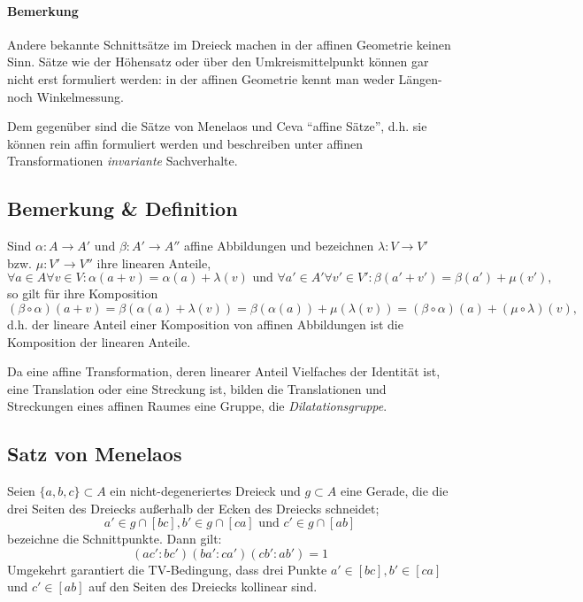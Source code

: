 \paragraph{Bemerkung}
	Andere bekannte Schnittsätze im Dreieck machen in der affinen Geometrie keinen Sinn. Sätze wie der Höhensatz oder über den Umkreismittelpunkt können gar nicht erst formuliert werden: in der affinen Geometrie kennt man weder Längen- noch Winkelmessung.
	
	Dem gegenüber sind die Sätze von Menelaos und Ceva "`affine Sätze"', d.h. sie können rein affin formuliert werden und beschreiben unter affinen Transformationen \emph{invariante} Sachverhalte.
\subsection{Bemerkung \& Definition}
	Sind $ \alpha:A\to A' $ und $ \beta:A'\to A'' $ affine Abbildungen und bezeichnen $ \lambda:V\to V' $ bzw. $ \mu:V'\to V'' $ ihre linearen Anteile,
		\[ \forall a\in A\forall v\in V:\alpha(a+v) = \alpha(a)+\lambda(v)\text{ und }\forall a'\in A'\forall v'\in V':\beta(a'+v') = \beta(a')+\mu(v'), \]
	so gilt für ihre Komposition
		\[ (\beta\circ\alpha)(a+v) = \beta(\alpha(a)+\lambda(v)) = \beta(\alpha(a))+\mu(\lambda(v)) = (\beta\circ\alpha)(a)+(\mu\circ\lambda)(v), \]
	d.h. der lineare Anteil einer Komposition von affinen Abbildungen ist die Komposition der linearen Anteile.
	
	\begin{Definition}[Dilatationsgruppe]
	Da eine affine Transformation, deren linearer Anteil Vielfaches der Identität ist, eine Translation oder eine Streckung ist, bilden die Translationen und Streckungen eines affinen Raumes eine Gruppe, die \emph{Dilatationsgruppe}.
	\end{Definition}
	
\subsection{Satz von Menelaos}
	\begin{Satz}
		Seien $ \{a,b,c\}\subset A $ ein nicht-degeneriertes Dreieck und $ g\subset A $ eine Gerade, die die drei Seiten des Dreiecks außerhalb der Ecken des Dreiecks schneidet;
			\[ a'\in g\cap [bc],b'\in g\cap [ca] \text{ und }c'\in g\cap [ab] \]
		bezeichne die Schnittpunkte. Dann gilt:
			\[ (ac':bc')(ba':ca')(cb':ab') = 1 \]
		Umgekehrt garantiert die TV-Bedingung, dass drei Punkte $ a'\in [bc],b'\in [ca] $ und $ c'\in [ab] $ auf den Seiten des Dreiecks kollinear sind.
	\end{Satz}
	

